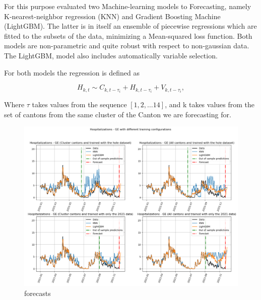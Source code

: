 \documentclass[11pt]{article}
\begin{document}
For this purpose evaluated two Machine-learning models to Forecasting, namely K-nearest-neighbor regression (KNN) and Gradient Boosting Machine (LightGBM). The latter is in itself an ensemble of piecewise regressions which are fitted to the subsets of the data, minimizing a Mean-squared loss function. Both models are non-parametric and quite robust with respect to non-gaussian data. The LightGBM, model also includes automatically variable selection.

For both models the regression is defined as 

    $$H_{k,t} \sim C_{k,t-\tau_i} + H_{k,t-\tau_i} +V_{k,t-\tau_i},$$
    
Where $\tau$ takes values from the sequence $[1,2,\ldots 14]$, and k takes values from the set of cantons from the same cluster of the Canton we are forecasting for.

\begin{figure}
\centering
\includegraphics{forecasts.png}
\caption{forecasts}
\end{figure}


    

    
    
    
\end{document}
